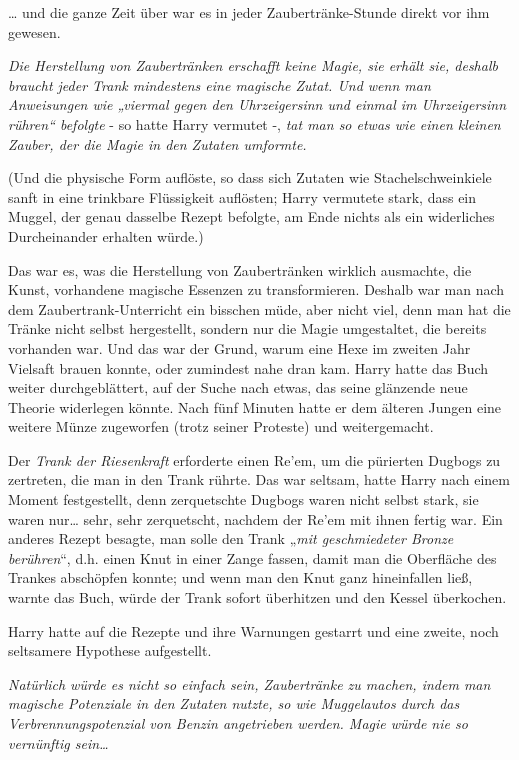 {… und die ganze Zeit über war es in jeder Zaubertränke-Stunde direkt vor ihm gewesen.

\emph{Die Herstellung von Zaubertränken erschafft keine Magie, sie erhält sie, deshalb braucht jeder Trank mindestens eine magische Zutat. Und wenn man Anweisungen wie „viermal gegen den Uhrzeigersinn und einmal im Uhrzeigersinn rühren“ befolgte} - so hatte Harry vermutet -, \emph{tat man so etwas wie einen kleinen Zauber, der die Magie in den Zutaten umformte.}

(Und die physische Form auflöste, so dass sich Zutaten wie Stachelschweinkiele sanft in eine trinkbare Flüssigkeit auflösten; Harry vermutete stark, dass ein Muggel, der genau dasselbe Rezept befolgte, am Ende nichts als ein widerliches Durcheinander erhalten würde.)

Das war es, was die Herstellung von Zaubertränken wirklich ausmachte, die Kunst, vorhandene magische Essenzen zu transformieren. Deshalb war man nach dem Zaubertrank-Unterricht ein bisschen müde, aber nicht viel, denn man hat die Tränke nicht selbst hergestellt, sondern nur die Magie umgestaltet, die bereits vorhanden war. Und das war der Grund, warum eine Hexe im zweiten Jahr Vielsaft brauen konnte, oder zumindest nahe dran kam. Harry hatte das Buch weiter durchgeblättert, auf der Suche nach etwas, das seine glänzende neue Theorie widerlegen könnte. Nach fünf Minuten hatte er dem älteren Jungen eine weitere Münze zugeworfen (trotz seiner Proteste) und weitergemacht.

Der \emph{Trank der Riesenkraft} erforderte einen Re'em, um die pürierten Dugbogs zu zertreten, die man in den Trank rührte. Das war seltsam, hatte Harry nach einem Moment festgestellt, denn zerquetschte Dugbogs waren nicht selbst stark, sie waren nur… sehr, sehr zerquetscht, nachdem der Re'em mit ihnen fertig war. Ein anderes Rezept besagte, man solle den Trank „\emph{mit geschmiedeter Bronze berühren}“, d.h. einen Knut in einer Zange fassen, damit man die Oberfläche des Trankes abschöpfen konnte; und wenn man den Knut ganz hineinfallen ließ, warnte das Buch, würde der Trank sofort überhitzen und den Kessel überkochen.

Harry hatte auf die Rezepte und ihre Warnungen gestarrt und eine zweite, noch seltsamere Hypothese aufgestellt.

\emph{Natürlich würde es nicht so einfach sein, Zaubertränke zu machen, indem man magische Potenziale in den Zutaten nutzte, so wie Muggelautos durch das Verbrennungspotenzial von Benzin angetrieben werden. Magie würde nie so} \emph{vernünftig sein…}

}
